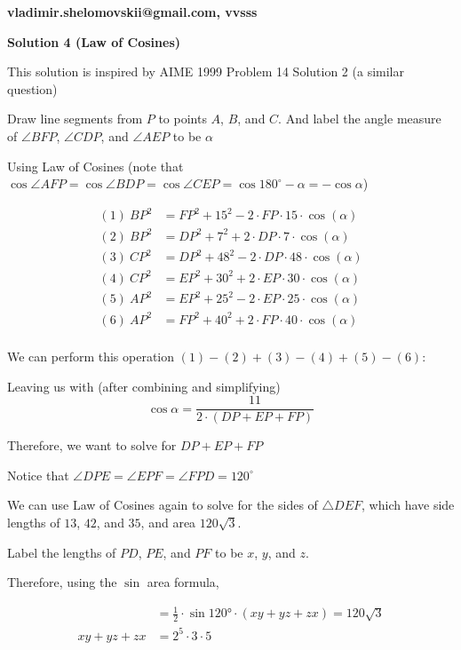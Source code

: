 \begin{enumerate}
{{ \textbf{vladimir.shelomovskii@gmail.com, vvsss}

 



\textbf{Solution 4 (Law of Cosines)}

This solution is inspired by AIME 1999 Problem 14 Solution 2 (a similar question)

 Draw line segments from $P$ to points $A$, $B$, and $C$. And label the angle measure of $\angle{BFP}$, $\angle{CDP}$, and $\angle{AEP}$ to be $\alpha$

 Using Law of Cosines (note that $\cos{\angle{AFP}}=\cos{\angle{BDP}}=\cos{\angle{CEP}}=\cos{180^\circ-\alpha}=-\cos{\alpha}$)

 
 \begin{align*} (1) \ BP^2 &= FP^2+15^2-2\cdot FP\cdot15\cdot\cos(\alpha)\\ (2) \ BP^2 &= DP^2+7^2+2\cdot DP\cdot7\cdot\cos(\alpha)\\ (3) \ CP^2 &= DP^2+48^2-2\cdot DP\cdot48\cdot\cos(\alpha)\\ (4) \ CP^2 &= EP^2+30^2+2\cdot EP\cdot30\cdot\cos(\alpha)\\ (5) \ AP^2 &= EP^2+25^2-2\cdot EP\cdot25\cdot\cos(\alpha)\\ (6) \ AP^2 &= FP^2+40^2+2\cdot FP\cdot40\cdot\cos(\alpha)\\ \end{align*}


 We can perform this operation $(1) - (2) + (3) - (4) + (5) - (6)$:

 Leaving us with (after combining and simplifying)
 \[\cos{\alpha}=\frac{11}{2\cdot(DP+EP+FP)}\]

 Therefore, we want to solve for $DP+EP+FP$

 Notice that $\angle{DPE}=\angle{EPF}=\angle{FPD}=120^\circ$

 We can use Law of Cosines again to solve for the sides of $\triangle{DEF}$, which have side lengths of $13$, $42$, and $35$, and area $120\sqrt{3}$.

 Label the lengths of $PD$, $PE$, and $PF$ to be $x$, $y$, and $z$.

 Therefore, using the $\sin$ area formula,

 
 \begin{align*} [\triangle{DEF}] &= \frac{1}{2}\cdot\sin{120°}\cdot(xy+yz+zx) = 120\sqrt{3} \\ xy+yz+zx &= 2^5\cdot3\cdot5 \end{align*}


}}
\end{enumerate}
